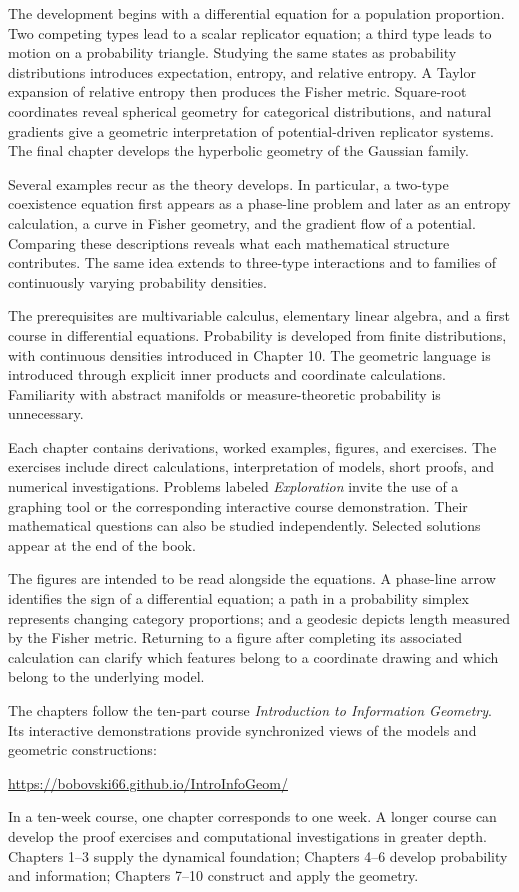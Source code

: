 \documentclass[11pt,oneside,openany]{book}
\theoremstyle{definition}
\theoremstyle{remark}
\numberwithin{equation}{chapter}
\begin{document}
The development begins with a differential equation for a population proportion. Two competing types lead to a scalar replicator equation; a third type leads to motion on a probability triangle. Studying the same states as probability distributions introduces expectation, entropy, and relative entropy. A Taylor expansion of relative entropy then produces the Fisher metric. Square-root coordinates reveal spherical geometry for categorical distributions, and natural gradients give a geometric interpretation of potential-driven replicator systems. The final chapter develops the hyperbolic geometry of the Gaussian family.

Several examples recur as the theory develops. In particular, a two-type coexistence equation first appears as a phase-line problem and later as an entropy calculation, a curve in Fisher geometry, and the gradient flow of a potential. Comparing these descriptions reveals what each mathematical structure contributes. The same idea extends to three-type interactions and to families of continuously varying probability densities.

The prerequisites are multivariable calculus, elementary linear algebra, and a first course in differential equations. Probability is developed from finite distributions, with continuous densities introduced in Chapter 10. The geometric language is introduced through explicit inner products and coordinate calculations. Familiarity with abstract manifolds or measure-theoretic probability is unnecessary.

Each chapter contains derivations, worked examples, figures, and exercises. The exercises include direct calculations, interpretation of models, short proofs, and numerical investigations. Problems labeled \emph{Exploration} invite the use of a graphing tool or the corresponding interactive course demonstration. Their mathematical questions can also be studied independently. Selected solutions appear at the end of the book.

The figures are intended to be read alongside the equations. A phase-line arrow identifies the sign of a differential equation; a path in a probability simplex represents changing category proportions; and a geodesic depicts length measured by the Fisher metric. Returning to a figure after completing its associated calculation can clarify which features belong to a coordinate drawing and which belong to the underlying model.

The chapters follow the ten-part course \emph{Introduction to Information Geometry}. Its interactive demonstrations provide synchronized views of the models and geometric constructions:
\begin{center}
\url{https://bobovski66.github.io/IntroInfoGeom/}
\end{center}
In a ten-week course, one chapter corresponds to one week. A longer course can develop the proof exercises and computational investigations in greater depth. Chapters 1--3 supply the dynamical foundation; Chapters 4--6 develop probability and information; Chapters 7--10 construct and apply the geometry.
\end{document}
